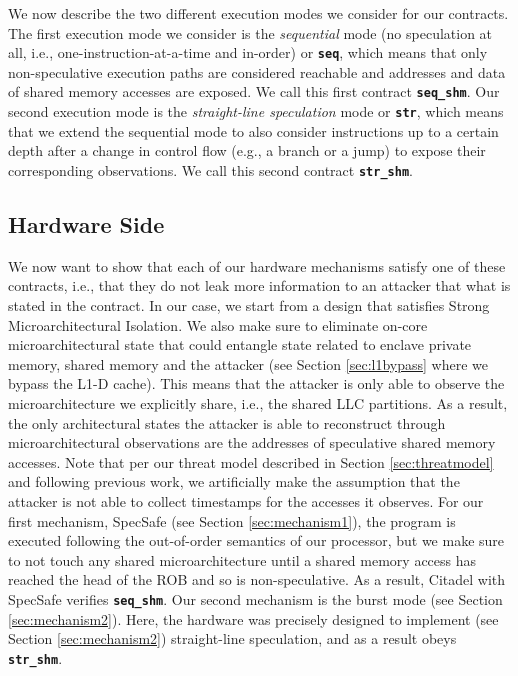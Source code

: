 We now describe the two different execution modes we consider for our contracts.
The first execution mode we consider is the \emph{sequential} mode (no speculation at all, i.e., one-instruction-at-a-time and in-order) or \textbf{\texttt{seq}}, which means that only non-speculative execution paths are considered reachable and addresses and data of shared memory accesses are exposed. 
We call this first contract \textbf{\texttt{seq\_shm}}.
Our second execution mode is the \emph{straight-line speculation} mode or \textbf{\texttt{str}}, which means that we extend the sequential mode to also consider instructions up to a certain depth after a change in control flow (e.g., a branch or a jump) to expose their corresponding observations.
We call this second contract \textbf{\texttt{str\_shm}}.

\subsection{Hardware Side}
We now want to show that each of our hardware mechanisms satisfy one of these contracts, i.e., that they do not leak more information to an attacker that what is stated in the contract.
In our case, we start from a design that satisfies Strong Microarchitectural Isolation.
We also make sure to eliminate on-core microarchitectural state that could entangle state related to enclave private memory, shared memory and the attacker (see Section \ref{sec:l1bypass} where we bypass the L1-D cache).
This means that the attacker is only able to observe the microarchitecture we explicitly share, i.e., the shared LLC partitions.
As a result, the only architectural states the attacker is able to reconstruct through microarchitectural observations are the addresses of speculative shared memory accesses.
Note that per our threat model described in Section \ref{sec:threatmodel} and following previous work, we artificially make the assumption that the attacker is not able to collect timestamps for the accesses it observes.
For our first mechanism, SpecSafe (see Section \ref{sec:mechanism1}), the program is executed following the out-of-order semantics of our processor, but 
we make sure to not touch any shared microarchitecture until a shared memory access has reached the head of the ROB and so is non-speculative.
As a result, Citadel with SpecSafe verifies \textbf{\texttt{seq\_shm}}.
Our second mechanism is the burst mode (see Section \ref{sec:mechanism2}).
Here, the hardware was precisely designed to implement (see Section \ref{sec:mechanism2}) straight-line speculation, and as a result obeys \textbf{\texttt{str\_shm}}.

